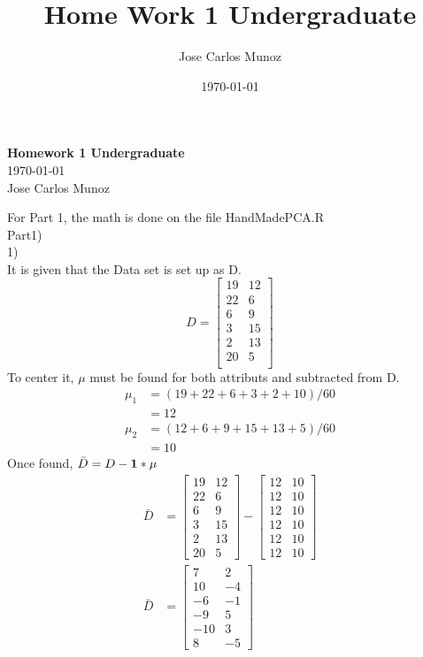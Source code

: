 \documentclass[12pt,english]{article}
\title{Home Work 1 Undergraduate}
\date{\today}
\author{Jose Carlos Munoz}
\begin{document}
\begin{center}
    \Large
    \textbf{Homework 1 Undergraduate}\\
    \small
    \today\\
    \large
    Jose Carlos Munoz
\end{center}
For Part 1, the math is done on the file HandMadePCA.R\\
Part1)\\
1)\\
It is given that the Data set is set up as D.\\
\begin{equation*}
D =
\begin{bmatrix}19 & 12 \\22 &  6 \\6  &  9 \\3 &  15 \\2 &  13 \\20 &  5 \\\end{bmatrix}
\end{equation*}
To center it, $\mu$ must be found for both attributs and subtracted from D.
\begin{equation*}
\begin{split}
\mu_{1} &= (19+22+6+3+2+10) / 60\\
 &= 12 \\
\mu_{2} &= (12+6+9+15+13+5) / 60\\
 &= 10
\end{split}
\end{equation*}
Once found, $\bar{D}= D -\bold{1}*\mu$
\begin{equation*}
\begin{split}
\bar{D}&=
\begin{bmatrix}19 & 12 \\22 &  6 \\ 6  &  9 \\ 3 &  15 \\ 2 &  13 \\20 &  5 \end{bmatrix}
-
\begin{bmatrix}12 & 10 \\12 & 10 \\12 & 10 \\12 & 10 \\12 & 10 \\12 & 10 \end{bmatrix}\\
\bar{D}&=
\begin{bmatrix}7 &  2 \\10 & -4 \\-6 & -1 \\-9 &  5 \\-10 &  3 \\8 & -5 \end{bmatrix}
\end{split}
\end{equation*}
\end{document}
